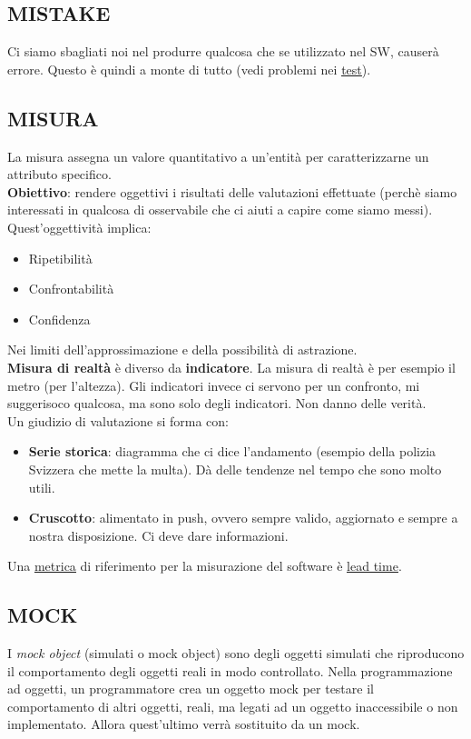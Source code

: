 		\subsection{MISTAKE}		\label{mistake}
		Ci siamo sbagliati noi nel produrre qualcosa che se utilizzato  nel SW, causerà errore. Questo è quindi a monte di tutto (vedi problemi nei \underline{\hyperref[test]{test}}).	
		
		\subsection{MISURA}	 \label{misura}
		La misura assegna un valore quantitativo a un'entità per caratterizzarne un attributo specifico. \\
		\textbf{Obiettivo}: rendere oggettivi i risultati delle valutazioni effettuate (perchè siamo interessati in qualcosa di osservabile che ci aiuti a capire come siamo messi).
		Quest'oggettività implica:
		\begin{itemize}
			\item Ripetibilità
			\item Confrontabilità
			\item Confidenza
		\end{itemize}
		Nei limiti dell'approssimazione e della possibilità di astrazione. \\
		\textbf{Misura di realtà} è diverso da \textbf{indicatore}.
		La misura di realtà è per esempio il metro (per l'altezza).
		Gli indicatori invece ci servono per un confronto, mi suggerisoco qualcosa, ma sono solo degli indicatori. Non danno delle verità. \\
		Un giudizio di valutazione si forma con: %
		\begin{itemize}
			\item \textbf{Serie storica}: diagramma che ci dice l'andamento (esempio della polizia Svizzera che mette la multa). Dà delle tendenze nel tempo che sono molto utili.
			\item \textbf{Cruscotto}: alimentato in push, ovvero sempre valido, aggiornato e sempre a nostra disposizione. Ci deve dare informazioni.
		\end{itemize}
		Una \underline{\hyperref[metrica]{metrica}} di riferimento per la misurazione del software è \underline{\hyperref[leadtime]{lead time}}. 
		

		\subsection{MOCK}		\label{mock}
		I \textit{mock object} (simulati o mock object) sono degli oggetti simulati che riproducono il comportamento degli oggetti reali in modo controllato. Nella programmazione ad oggetti, un programmatore crea un oggetto mock per testare il comportamento di altri oggetti, reali, ma legati ad un oggetto inaccessibile o non implementato. Allora quest'ultimo verrà sostituito da un mock.
		

